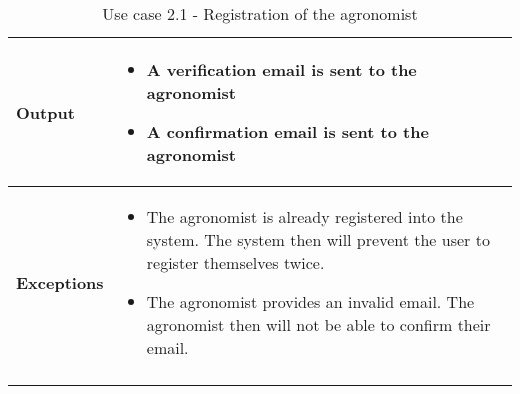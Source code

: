 \begin{longtable}[H]{ | l | p{10cm} | }
{\cellcolor[rgb]{0.753,0.753,0.753}}\textbf{Output} & 
\begin{itemize}
    \item A verification email is sent to the agronomist
    \item A confirmation email is sent to the agronomist
\end{itemize}
\\ \hline
{\cellcolor[rgb]{0.753,0.753,0.753}}\textbf{Exceptions} &
\begin{itemize}
    \item The agronomist is already registered into the system. The system then will prevent the user to register themselves twice.
    \item The agronomist provides an invalid email. The agronomist then will not be able to confirm their email.
\end{itemize}
\\ \hline
\caption{Use case 2.1 - Registration of the agronomist}
\\
\end{longtable}